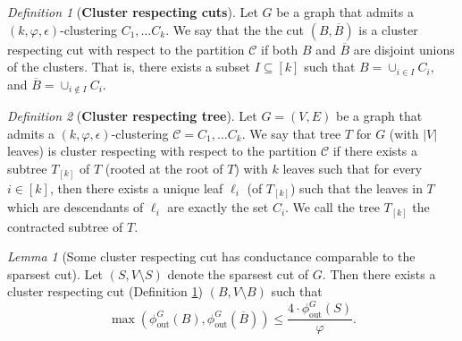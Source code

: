 \documentclass[letterpaper,11pt]{article}
\newcommand{\cC}{\mathcal{C}}
\theoremstyle{plain}
\theoremstyle{definition}
\theoremstyle{remark}
\newtheorem{lemmma}{Lemma}
\newtheorem{mydef}{Definition}
\begin{document}
\begin{mydef}[\textbf{Cluster respecting cuts}] \label{def:cluster:respecting:cut}
	Let $G$ be a graph that admits a $(k, \varphi, \epsilon)$-clustering
	$C_1, \ldots C_k$. We say that the the cut $(B,\overline{B})$ is a cluster respecting cut with 
	respect to the partition $\cC$ if both $B$ and $\overline{B}$
	are disjoint unions of the clusters. That is, there exists a subset $I \subseteq [k]$ such that 
	$B = \cup_{i \in I} C_i$, and $\overline{B} = \cup_{i \not\in I} C_i$.
\end{mydef}

\begin{mydef}[\textbf{Cluster respecting  tree}] \label{def:cluster:resp:tree}
Let $G=(V,E)$ be a graph that admits a $(k, \varphi, \epsilon)$-clustering $\cC=C_1, \ldots C_k$. We say that tree $T$ for $G$ (with $|V|$ leaves) is cluster respecting with respect to the partition $\cC $ if there exists a subtree $T_{[k]}$ of $T$ (rooted at the root of $T$) with $k$ leaves such that for every $i \in [k]$, then there exists a unique leaf $\ell_i$ (of $T_{[k]}$) such that the leaves in $T$ which are descendants of $\ell_i$ are exactly the set $C_i$. We call the tree $T_{[k]}$ the contracted subtree of $T$.
\end{mydef}

\begin{lemmma}[Some cluster respecting cut has conductance comparable to the sparsest cut]  
	\label{lem:cluster-respecting-cuts}
  Let $(S, V \setminus S)$
	denote the sparsest cut of $G$. Then there exists a cluster respecting cut
	(Definition \ref{def:cluster:respecting:cut}) $(B, V \setminus B)$ such that \[\max(\phi_{\text{out}}^G(B), \phi_{\text{out}}^G(\overline{B})) \leq \frac{4\cdot \phi_{\text{out}}^G(S)}{\varphi}  \text{.}\]
\end{lemmma}
\end{document}
